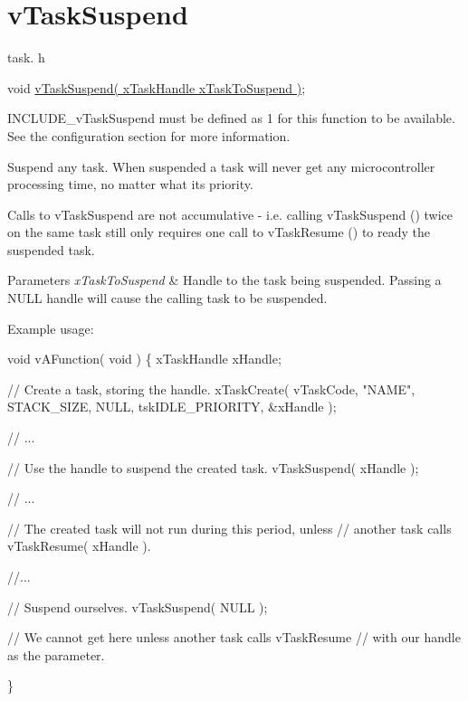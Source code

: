 \hypertarget{group__vTaskSuspend}{}\section{v\+Task\+Suspend}
\label{group__vTaskSuspend}
task. h 
\begin{DoxyPre}void \hyperlink{task_8h_ad376f6f25b456235119c32a78514ed7a}{vTaskSuspend( xTaskHandle xTaskToSuspend )};\end{DoxyPre}


I\+N\+C\+L\+U\+D\+E\+\_\+v\+Task\+Suspend must be defined as 1 for this function to be available. See the configuration section for more information.

Suspend any task. When suspended a task will never get any microcontroller processing time, no matter what its priority.

Calls to v\+Task\+Suspend are not accumulative -\/ i.\+e. calling v\+Task\+Suspend () twice on the same task still only requires one call to v\+Task\+Resume () to ready the suspended task.


\begin{DoxyParams}{Parameters}
{\em x\+Task\+To\+Suspend} & Handle to the task being suspended. Passing a N\+U\+LL handle will cause the calling task to be suspended.\\
\hline
\end{DoxyParams}
Example usage\+: 
\begin{DoxyPre}
void vAFunction( void )
\{
xTaskHandle xHandle;
\begin{DoxyVerb}// Create a task, storing the handle.
xTaskCreate( vTaskCode, "NAME", STACK_SIZE, NULL, tskIDLE_PRIORITY, &xHandle );

// ...

// Use the handle to suspend the created task.
vTaskSuspend( xHandle );

// ...

// The created task will not run during this period, unless
// another task calls vTaskResume( xHandle ).

//...


// Suspend ourselves.
vTaskSuspend( NULL );

// We cannot get here unless another task calls vTaskResume
// with our handle as the parameter.
\end{DoxyVerb}

\}
  \end{DoxyPre}
 
